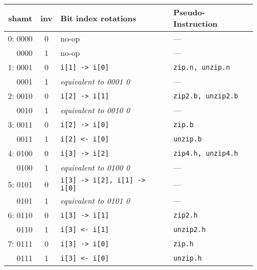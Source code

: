 \begin{table}[h]
\begin{small}
\begin{center}
\begin{tabular}{r c l l}
\multicolumn{1}{c}{shamt} &
\multicolumn{1}{c}{inv} &
Bit index rotations &
Pseudo-Instruction \\

\hline

 0: 0000 & 0 & no-op                            & ---                    \\
    0000 & 1 & no-op                            & ---                    \\
 1: 0001 & 0 & {\tt i[1] -> i[0]}               & {\tt zip.n, unzip.n}   \\
    0001 & 1 & {\it equivalent to 0001 0}       & ---                    \\
 2: 0010 & 0 & {\tt i[2] -> i[1]}               & {\tt zip2.b, unzip2.b} \\
    0010 & 1 & {\it equivalent to 0010 0}       & ---                    \\
 3: 0011 & 0 & {\tt i[2] -> i[0]}               & {\tt zip.b}            \\
    0011 & 1 & {\tt i[2] <- i[0]}               & {\tt unzip.b}          \\

\hline

 4: 0100 & 0 & {\tt i[3] -> i[2]}               & {\tt zip4.h, unzip4.h} \\
    0100 & 1 & {\it equivalent to 0100 0}       & ---                    \\
 5: 0101 & 0 & {\tt i[3] -> i[2], i[1] -> i[0]} & ---                    \\
    0101 & 1 & {\it equivalent to 0101 0}       & ---                    \\
 6: 0110 & 0 & {\tt i[3] -> i[1]}               & {\tt zip2.h}           \\
    0110 & 1 & {\tt i[3] <- i[1]}               & {\tt unzip2.h}         \\
 7: 0111 & 0 & {\tt i[3] -> i[0]}               & {\tt zip.h}            \\
    0111 & 1 & {\tt i[3] <- i[0]}               & {\tt unzip.h}          \\

\hline


\end{tabular}
\end{center}
\end{small}
\end{table}
